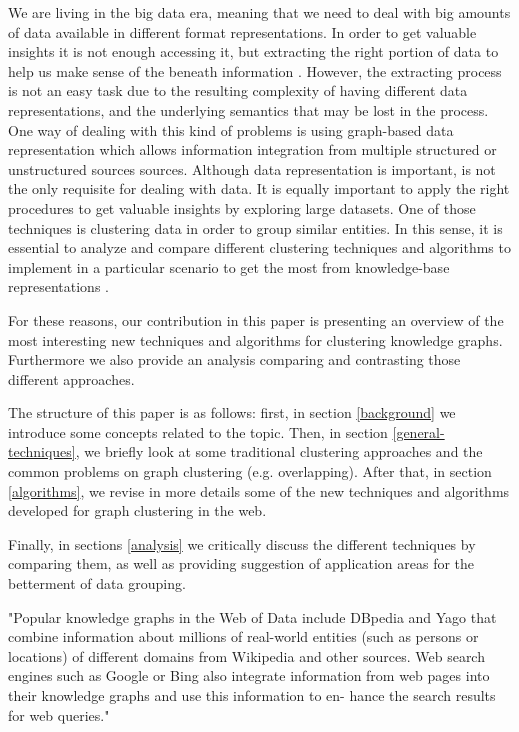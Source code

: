 \documentclass[runningheads]{llncs}
\begin{document}
We are living in the big data era, meaning that we need to deal with big amounts of data available in different format representations. In order to get valuable insights it is not enough accessing it, but extracting the right portion of data to help us make sense of the beneath information \cite{Pedrycz}. However, the extracting process is not an easy task due to the resulting complexity of having different data representations, and the underlying semantics that may be lost in the process. One way of dealing with this kind of problems is using graph-based data representation which allows information integration from multiple structured or unstructured sources sources.
Although data representation is important, is not the only requisite for dealing with data. It is equally important to apply the right procedures to get valuable insights by exploring large datasets. One of those techniques is clustering data in order to group similar entities.  In this sense, it is essential to analyze and compare different clustering techniques and algorithms to implement in a particular scenario to get the most from knowledge-base representations \cite{Pedrycz}.

For these reasons, our contribution in this paper is presenting an overview of the most interesting new techniques and algorithms for clustering knowledge graphs. Furthermore we also provide an analysis comparing and contrasting those different approaches.

The structure of this paper is as follows: first, in section \ref{background} we introduce some concepts related to the topic. Then, in section \ref{general-techniques}, we briefly look at some traditional clustering approaches and the common problems on graph clustering (e.g. overlapping). After that, in section \ref{algorithms}, we revise in more details some of the new techniques and algorithms developed for graph clustering in the web.

Finally, in sections \ref{analysis} we critically discuss the different techniques by comparing them, as well as providing suggestion of application areas for the betterment of data grouping. 


"Popular knowledge graphs in the Web of Data include DBpedia and Yago that combine information about millions of real-world entities (such as persons or locations) of different domains from Wikipedia and other sources. Web search engines such as Google or Bing also integrate information from web pages into their knowledge graphs and use this information to en- hance the search results for web queries." \cite{Saeedi}
\end{document}
